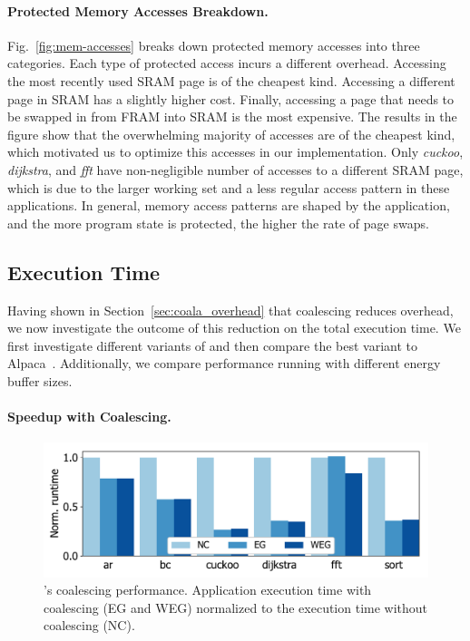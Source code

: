 \paragraph{Protected Memory Accesses Breakdown.}
%
Fig.~\ref{fig:mem-accesses} breaks down protected memory accesses
into three categories.
%
Each type of protected access incurs a different overhead.
Accessing the most recently used SRAM page is of the cheapest kind.
Accessing a different page in SRAM has a slightly higher cost.
Finally, accessing a page that needs to be swapped in
from FRAM into SRAM is the most expensive.
%
The results in the figure show that the overwhelming majority of accesses are
of the cheapest kind, which motivated us to optimize this accesses in our
implementation.
%
Only \textit{cuckoo}, \textit{dijkstra}, and \textit{fft} have non-negligible
number of accesses to a different SRAM page, which is due to the larger working
set and a less regular access pattern in these applications.
%
In general, memory access patterns are shaped by the application, and the more
program state is protected, the higher the rate of page swaps.
%
\subsection{Execution Time}
\label{sec:result_coalescing}
%
Having shown in Section~\ref{sec:coala_overhead} that coalescing reduces
overhead, we now investigate the outcome of this reduction on the total
execution time. We first investigate different variants of \sys and
then compare the best variant to Alpaca~\cite{alpaca}. Additionally, we compare \sys
performance running with different energy buffer sizes. 

\paragraph{Speedup with Coalescing.}
%
\begin{figure}
    \includegraphics[width=.8\columnwidth]{figures/coalStrategies}%
    \caption{\sys's coalescing performance. Application execution time
with coalescing (EG and WEG) normalized to the execution time
without coalescing (NC).}
\label{fig:coalescing}
\end{figure}


